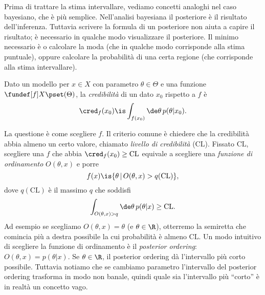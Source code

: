 Prima di trattare la stima intervallare,
vediamo concetti analoghi nel caso bayesiano,
che è più semplice.
Nell'analisi bayesiana il posteriore è il risultato dell'inferenza.
Tuttavia scrivere la formula di un posteriore non aiuta a capire il risultato;
è necessario in qualche modo visualizzare il posteriore.
Il minimo necessario è o calcolare la moda
(che in qualche modo corrisponde alla stima puntuale),
oppure calcolare la probabilità di una certa regione (che corrisponde alla stima intervallare).
\begin{definition}[Credibilità]
	\label{th:cred}
	Dato un modello per $x\in X$ con parametro $\theta\in\Theta$
	e una funzione $\fundef[f]X\pset(\Theta)$,
	la \emph{credibilità} di un dato $x_0$ rispetto a $f$ è
	\begin{equation*}
		\cred_f(x_0)
		\is \int_{f(x_0)} \de \theta\, p(\theta|x_0).
	\end{equation*}
\end{definition}
La questione è come scegliere $f$.
Il criterio comune è chiedere che la credibilità abbia almeno un certo valore,
chiamato \emph{livello di credibilità} ($\mathrm{CL}$).
Fissato $\mathrm{CL}$, scegliere una $f$ che abbia $\cred_f(x_0)\ge\mathrm{CL}$
equivale a scegliere una \emph{funzione di ordinamento} $O(\theta,x)$ e porre
\begin{equation*}
	f(x) \is \{\theta\,|\,O(\theta,x)>q(\mathrm{CL})\},
\end{equation*}
dove $q(\mathrm{CL})$ è il massimo $q$ che soddisfi
\begin{equation*}
	\int_{O(\theta,x)>q} \de\theta\, p(\theta|x) \ge \mathrm{CL}.
\end{equation*}
Ad esempio se scegliamo $O(\theta,x)=\theta$ (e $\theta\in\R$),
otterremo la semiretta che comincia più a destra possibile la cui probabilità è almeno $\mathrm{CL}$.
Un modo intuitivo di scegliere la funzione di ordinamento è il \emph{posterior ordering}:
$O(\theta,x) = p(\theta|x)$.
Se $\theta\in\R$, il posterior ordering dà l'intervallo più corto possibile.
Tuttavia notiamo che se cambiamo parametro l'intervallo del posterior ordering trasforma in modo non banale,
quindi quale sia l'intervallo più ``corto'' è in realtà un concetto vago.

